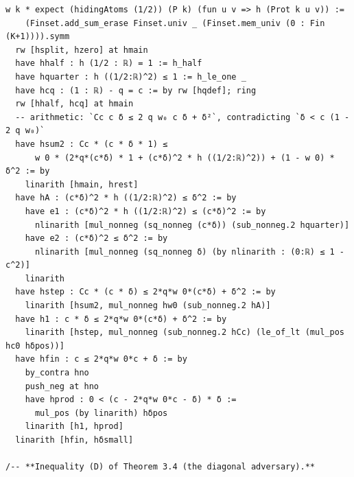 \documentclass[11pt,a4paper]{article}
\theoremstyle{definition}
\theoremstyle{remark}
\begin{document}
\begin{Verbatim}[fontsize=\scriptsize,formatcom=\leanmono,samepage=false]
            w k * expect (hidingAtoms (1/2)) (P k) (fun u v => h (Prot k u v)) :=
    (Finset.add_sum_erase Finset.univ _ (Finset.mem_univ (0 : Fin (K+1)))).symm
  rw [hsplit, hzero] at hmain
  have hhalf : h (1/2 : ℝ) = 1 := h_half
  have hquarter : h ((1/2:ℝ)^2) ≤ 1 := h_le_one _
  have hcq : (1 : ℝ) - q = c := by rw [hqdef]; ring
  rw [hhalf, hcq] at hmain
  -- arithmetic: `Cc c δ ≤ 2 q w₀ c δ + δ²`, contradicting `δ < c (1 - 2 q w₀)`
  have hsum2 : Cc * (c * δ * 1) ≤
      w 0 * (2*q*(c*δ) * 1 + (c*δ)^2 * h ((1/2:ℝ)^2)) + (1 - w 0) * δ^2 := by
    linarith [hmain, hrest]
  have hA : (c*δ)^2 * h ((1/2:ℝ)^2) ≤ δ^2 := by
    have e1 : (c*δ)^2 * h ((1/2:ℝ)^2) ≤ (c*δ)^2 := by
      nlinarith [mul_nonneg (sq_nonneg (c*δ)) (sub_nonneg.2 hquarter)]
    have e2 : (c*δ)^2 ≤ δ^2 := by
      nlinarith [mul_nonneg (sq_nonneg δ) (by nlinarith : (0:ℝ) ≤ 1 - c^2)]
    linarith
  have hstep : Cc * (c * δ) ≤ 2*q*w 0*(c*δ) + δ^2 := by
    linarith [hsum2, mul_nonneg hw0 (sub_nonneg.2 hA)]
  have h1 : c * δ ≤ 2*q*w 0*(c*δ) + δ^2 := by
    linarith [hstep, mul_nonneg (sub_nonneg.2 hCc) (le_of_lt (mul_pos hc0 hδpos))]
  have hfin : c ≤ 2*q*w 0*c + δ := by
    by_contra hno
    push_neg at hno
    have hprod : 0 < (c - 2*q*w 0*c - δ) * δ :=
      mul_pos (by linarith) hδpos
    linarith [h1, hprod]
  linarith [hfin, hδsmall]

/-- **Inequality (D) of Theorem 3.4 (the diagonal adversary).**


\end{Verbatim}
\end{document}
